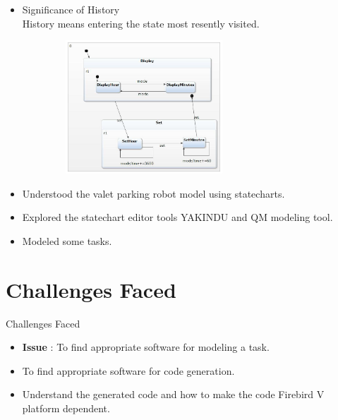 \documentclass[10pt, a4paper]{beamer}
\begin{document}
                \begin{frame}
                \begin{itemize}
                \item Significance of History\\
                History means entering the state most resently visited.\\
                \begin{figure}[h]
                \centering
                \includegraphics[width=7cm,height=5cm]{clock.jpg}
                \end{figure}
                \end{itemize}
                \end{frame}
                \begin{frame}
            \begin{itemize}
           \item Understood the valet parking robot model using statecharts.
            \item Explored the statechart editor tools YAKINDU and QM modeling tool.
        \item Modeled some tasks.
    \end{itemize}
\end{frame}


\section{Challenges Faced}
\begin{frame}{Challenges Faced}
    \begin{itemize}
        \item \textbf{Issue} : To find appropriate software for modeling a task.
        \item To find appropriate software for code generation.
        \item  Understand the generated code and how to make the code Firebird V platform dependent.
        \end{itemize}
\end{frame}
\end{document}
